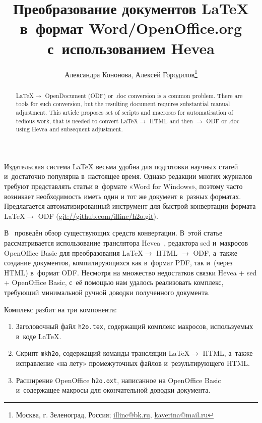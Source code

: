 \documentclass[10pt, a5paper]{article}
\begin{document}
\title{Преобразование документов \LaTeX{} в~формат Word/OpenOffice.org с~использованием Hevea}%

\author{Александра Кононова, Алексей Городилов\footnote{Москва, г. Зеленоград, Россия; \url{illinc@bk.ru}, \url{kaverina@mail.ru}}}
\maketitle

\begin{abstract}
\LaTeX $\to$ OpenDocument (ODF) or .doc conversion is a common problem. 
There are tools for such conversion, but the resulting document requires 
substantial manual adjustment. This article proposes set of scripts and 
macroses for automatisation of tedious work, that is needed to convert 
\LaTeX $\to$ HTML and then $\to$ ODF or .doc  using Hevea and subsequent 
adjustment.
\end{abstract}

Издательская система \LaTeX{} весьма удобна для подготовки научных статей и~достаточно популярна в~настоящее время.
Однако редакции многих журналов требуют представлять статьи в~формате «Word for Windows»,
поэтому часто
возникает необходимость иметь один и тот же документ в~разных форматах.
Предлагается автоматизированный инструмент для быстрой конвертации формата \LaTeX $\to$ ODF (\url{git://github.com/illinc/h2o.git}).

В~\cite{h2o:virens:latex-word-openoffice} проведён обзор существующих средств конвертации.
В~этой статье рассматривается использование транслятора Hevea~\cite{h2o:hevea.inria.fr}, редактора sed и~макросов OpenOffice Basic для преобразования \LaTeX \linebreak $\to$ HTML $\to$ ODF, а~также создание документов, компилирующихся как в~формат PDF, так и~(через HTML) в~формат ODF.
Несмотря на множество недостатков связки Hevea + sed + OpenOffice Basic, с~её помощью нам удалось реализовать комплекс, требующий минимальной ручной доводки полученного документа.

Комплекс разбит на три компонента:
\begin{enumerate}
\item Заголовочный файл \verb!h2o.tex!, содержащий комплекс макросов, используемых в~коде \LaTeX.
\item Скрипт \verb!mkh2o!, содержащий команды трансляции \LaTeX $\to$ \linebreak HTML, а~также исправление «на лету» промежуточных файлов и~результирующего HTML.
\item Расширение OpenOffice \verb!h2o.oxt!, написанное на OpenOffice \linebreak Basic и~содержащее макросы для окончательной доводки документа.
\end{enumerate}
\end{document}
